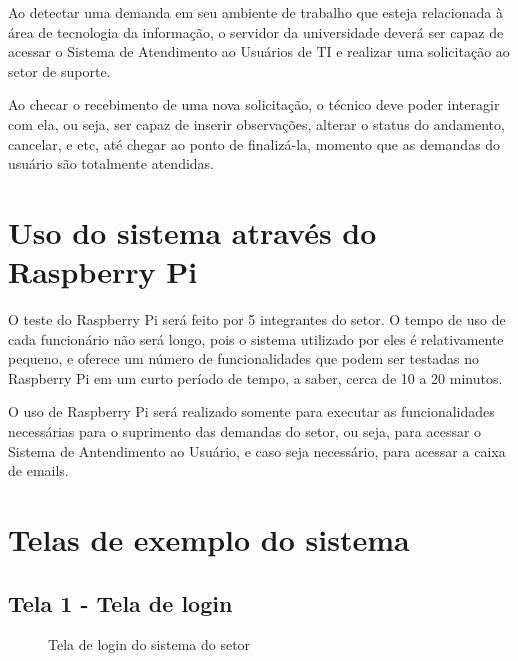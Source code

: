 Ao detectar uma demanda em seu ambiente de trabalho que esteja relacionada à área de tecnologia da informação, o servidor da universidade deverá ser capaz de acessar o Sistema de Atendimento ao Usuários de TI e realizar uma solicitação ao setor de suporte.

Ao checar o recebimento de uma nova solicitação, o técnico deve poder interagir com ela, ou seja, ser capaz de inserir observações, alterar o status do andamento, cancelar, e etc, até chegar ao ponto de finalizá-la, momento que as demandas do usuário são totalmente atendidas.

\section{Uso do sistema através do Raspberry Pi}

O teste do Raspberry Pi será feito por 5 integrantes do setor. O tempo de uso de cada funcionário não será longo, pois o sistema utilizado por eles é relativamente pequeno, e oferece um número de funcionalidades que podem ser testadas no Raspberry Pi em um curto período de tempo, a saber, cerca de 10 a 20 minutos.

O uso de Raspberry Pi será realizado somente para executar as funcionalidades necessárias para o suprimento das demandas do setor, ou seja, para acessar o Sistema de Antendimento ao Usuário, e caso seja necessário, para acessar a caixa de emails.

\newpage

\section{Telas de exemplo do sistema}

\subsection{Tela 1 - Tela de login}

\begin{figure}[ht]
    \centering
    \caption{Tela de login do sistema do setor}
\end{figure}

